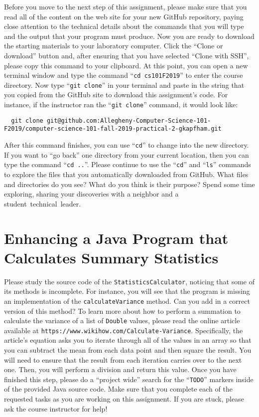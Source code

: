 \documentclass[11pt]{article}
\newcommand{\mainprogram}{\lstinline{StatisticsCalculator}}
\newcommand{\command}[1]{``\lstinline{#1}''}
\newcommand{\program}[1]{\lstinline{#1}}
\newcommand{\url}[1]{\lstinline{#1}}
\newcommand{\step}[1]{``{#1}''}
\begin{document}
Before you move to the next step of this assignment, please make sure that you
read all of the content on the web site for your new GitHub repository, paying
close attention to the technical details about the commands that you will type
and the output that your program must produce. Now you are ready to download the
starting materials to your laboratory computer. Click the ``Clone or download''
button and, after ensuring that you have selected ``Clone with SSH'', please
copy this command to your clipboard. At this point, you can open a new terminal
window and type the command \command{cd cs101F2019} to enter the course
directory. Now type \command{git clone} in your terminal and paste in the string
that you copied from the GitHub site to download this assignment's code. For
instance, if the instructor ran the \command{git clone} command, it would look
like:

\begin{lstlisting}
  git clone git@github.com:Allegheny-Computer-Science-101-F2019/computer-science-101-fall-2019-practical-2-gkapfham.git
\end{lstlisting}

After this command finishes, you can use \command{cd} to change into the new
directory. If you want to \step{go back} one directory from your current
location, then you can type the command \command{cd ..}. Please continue to use
the \command{cd} and \command{ls} commands to explore the files that you
automatically downloaded from GitHub. What files and directories do you see?
What do you think is their purpose? Spend some time exploring, sharing your
discoveries with a neighbor and a \mbox{student technical leader}.

\section*{Enhancing a Java Program that Calculates Summary Statistics}

Please study the source code of the \mainprogram, noticing that some of its
methods is incomplete. For instance, you will see that the program is missing an
implementation of the \program{calculateVariance} method. Can you add in a
correct version of this method? To learn more about how to perform a summation
to calculate the variance of a list of \program{Double} values, please read the
online article available at \url{https://www.wikihow.com/Calculate-Variance}.
Specifically, the article's equation asks you to iterate through all of the
values in an array so that you can subtract the mean from each data point and
then square the result. You will need to ensure that the result from each
iteration carries over to the next one. Then, you will perform a division and
return this value. Once you have finished this step, please do a ``project
wide'' search for the \command{TODO} markers inside of the provided Java source
code. Make sure that you complete each of the requested tasks as you are working
on this assignment. If you are stuck, please ask the course instructor for help!
\end{document}
